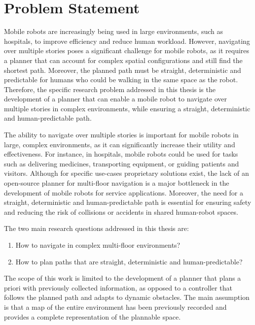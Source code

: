 \section{Problem Statement}
\label{sec:problem_statement}
Mobile robots are increasingly being used in large environments, such as hospitals, to improve efficiency and reduce human workload. However, navigating over multiple stories poses a significant challenge for mobile robots, as it requires a planner that can account for complex spatial configurations and still find the shortest path. Moreover, the planned path must be straight, deterministic and predictable for humans who could be walking in the same space as the robot. Therefore, the specific research problem addressed in this thesis is the development of a planner that can enable a mobile robot to navigate over multiple stories in complex environments, while ensuring a straight, deterministic and human-predictable path. 

The ability to navigate over multiple stories is important for mobile robots in large, complex environments, as it can significantly increase their utility and effectiveness. For instance, in hospitals, mobile robots could be used for tasks such as delivering medicines, transporting equipment, or guiding patients and visitors. Although for specific use-cases proprietary solutions exist, the lack of an open-source planner for multi-floor navigation is a major bottleneck in the development of mobile robots for service applications. Moreover, the need for a straight, deterministic and human-predictable path is essential for ensuring safety and reducing the risk of collisions or accidents in shared human-robot spaces.

The two main research questions addressed in this thesis are:
\begin{enumerate}
    \item How to navigate in complex multi-floor environments?
    \item How to plan paths that are straight, deterministic and human-predictable?
\end{enumerate}

The scope of this work is limited to the development of a planner that plans a priori with previously collected information, as opposed to a controller that follows the planned path and adapts to dynamic obstacles. The main assumption is that a map of the entire environment has been previously recorded and provides a complete representation of the plannable space.

